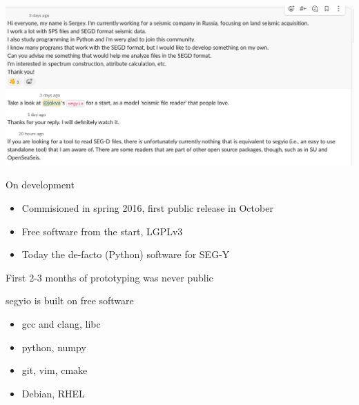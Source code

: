 \documentclass[pdf]{beamer}
\begin{document}
\begin{frame}
    \begin{center}
        \includegraphics[height=0.5\textheight, keepaspectratio]{img/segyio-praise}
    \end{center}
\end{frame}

\begin{frame}
    \begin{center}
        On development
    \end{center}
\end{frame}

\begin{frame}
    \begin{itemize}
        \item Commisioned in spring 2016, first public release in October
        \item Free software from the start, LGPLv3
        \item Today the de-facto (Python) software for SEG-Y
    \end{itemize}
    First 2-3 months of prototyping was never public
\end{frame}

\begin{frame}
    segyio is built on free software
    \begin{itemize}
        \item gcc and clang, libc
        \item python, numpy
        \item git, vim, cmake
        \item Debian, RHEL
    \end{itemize}
\end{frame}
\end{document}
